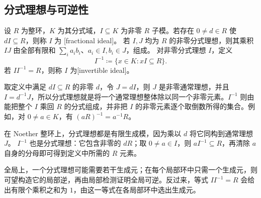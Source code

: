 \subsection{分式理想与可逆性}
\label{b3:subsec:1003:03}

\begin{definition}\label{b3:def:fractional-invertible-ideal}
	设 \(R\) 为整环，\(K\) 为其分式域，\(I\subseteq K\) 为非零 \(R\) 子模。若存在 \(0\ne d\in R\) 使 \(dI\subseteq R\)，则称 \(I\) 为 [fractional ideal]。 若 \(I,J\) 均为 \(R\) 的非零分式理想，则其乘积 \(IJ\) 由全部有限和 \(\sum_i a_ib_i\)、\(a_i\in I,b_i\in J\)，组成。 对非零分式理想 \(I\)，定义
	\[
		I^{-1}\coloneqq\{x\in K:xI\subseteq R\}.
	\]
	若 \(II^{-1}=R\)，则称 \(I\) 为[invertible ideal]。
\end{definition}

取定义中满足 \(dI\subseteq R\) 的非零 \(d\)，令 \(J=dI\)，则 \(J\) 是非零通常理想，并且 \(I=d^{-1}J\)，所以分式理想就是将一个通常理想整体除以同一个非零元素。\(I^{-1}\) 则由能把整个 \(I\) 乘回 \(R\) 的分式组成，并非把 \(I\) 的非零元素逐个取倒数所得的集合。例如，对 \(0\ne a\in K\)，有 \((aR)^{-1}=a^{-1}R\)。

在 Noether 整环上，分式理想都是有限生成模，因为乘以 \(d\) 将它同构到通常理想 \(J\)。 \(I^{-1}\) 也是分式理想：它包含非零的 \(dR\)；取 \(0\ne a\in I\)，则 \(aI^{-1}\subseteq R\)，再清除 \(a\) 自身的分母即可得到定义中所需的 \(R\) 元素。

全局上，一个分式理想可能需要若干生成元；在每个局部环中只需一个生成元，则可望构造它的局部逆，再由局部检测证明全局可逆。反过来，等式 \(II^{-1}=R\) 会给出有限个乘积之和为 \(1\)，由这一等式在各局部环中选出生成元。

